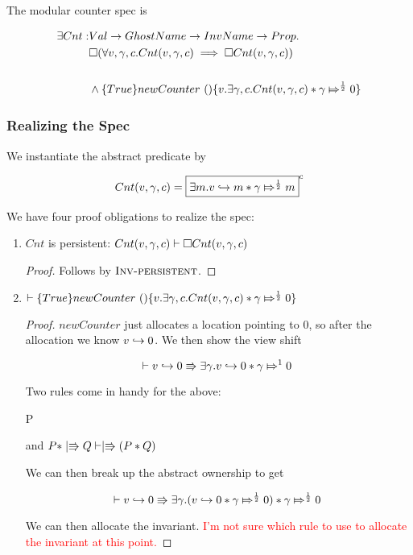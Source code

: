 The modular counter spec is 

\begin{align*}
\exists Cnt : & Val \rightarrow GhostName \rightarrow InvName \rightarrow Prop.\\
& \pemod{ ( \forall v, \gamma, c. \Cnt{v}{\gamma}{c} \implies \pemod{ \Cnt{v}{\gamma}{c} } ) } \\
\\
& \land \hot{True}{ newCounter \text{ }()}{v. \exists \gamma, c. \Cnt{v}{\gamma}{c} * \apointsto{\gamma}{0}{\frac{1}{2}}}
\end{align*}

\subsubsection{Realizing the Spec}

We instantiate the abstract predicate by

\[
\Cnt{v}{\gamma}{c} = \invm{\exists m. \pointsto{v}{m} * \apointsto{\gamma}{m}{\frac{1}{2}}}{c}
\] 

We have four proof obligations to realize the spec:
\begin{enumerate}

\item $Cnt$ is persistent: $\Cnt{v}{\gamma}{c} \vdash \pemod{\Cnt{v}{\gamma}{c}}$

\begin{proof}
Follows by $\textsc{Inv-persistent}$.
\end{proof}

\item $ \vdash \hot{True}{ newCounter \text{ }()}{v. \exists \gamma, c. \Cnt{v}{\gamma}{c} * \apointsto{\gamma}{0}{\frac{1}{2}}}$

\begin{proof}
$newCounter$ just allocates a location pointing to $0$, so after the allocation we know $\pointsto{v}{0}$.  We then show the view shift

\[
\vdash \vshift{\pointsto{v}{0}}{\exists \gamma. \pointsto{v}{0} * \apointsto{\gamma}{0}{1}}\
\]

Two rules come in handy for the above:

\infrule
  {\vdash P \implies {}}
  {\vdash {}}

and $P * \upmod{Q}  \vdash \upmod{(P * Q)}$

We can then break up the abstract ownership to get

\[
\vdash \vshift{\pointsto{v}{0}}{\exists \gamma. (\pointsto{v}{0} * \apointsto{\gamma}{0}{\frac{1}{2}}) * \apointsto{\gamma}{0}{\frac{1}{2}}}\
\]

We can then allocate the invariant. \textcolor{red}{I'm not sure which rule to use to allocate the invariant at this point.}

\end{proof}


\end{enumerate}